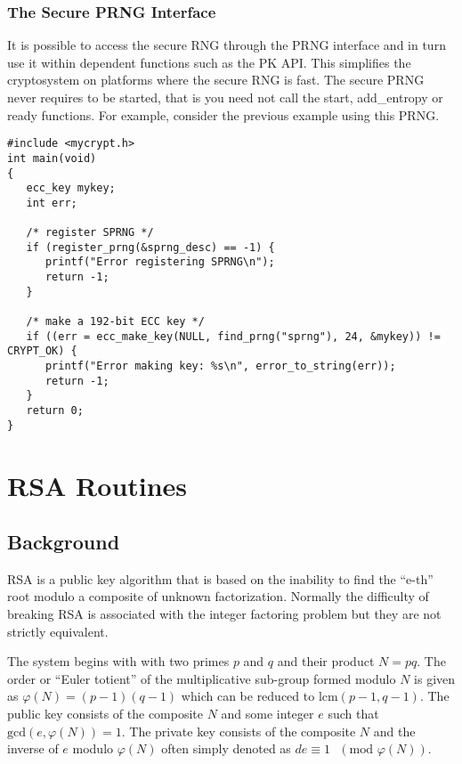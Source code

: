 \documentclass[b5paper]{book}
\def\phi{\varphi}
\begin{document}
\subsection{The Secure PRNG Interface}
It is possible to access the secure RNG through the PRNG interface and in turn use it within dependent functions such
as the PK API.  This simplifies the cryptosystem on platforms where the secure RNG is fast.  The secure PRNG never 
requires to be started, that is you need not call the start, add\_entropy or ready functions.  For example, consider
the previous example using this PRNG.

\begin{small}
\begin{verbatim}
#include <mycrypt.h>
int main(void)
{
   ecc_key mykey;
   int err;

   /* register SPRNG */
   if (register_prng(&sprng_desc) == -1) {
      printf("Error registering SPRNG\n");
      return -1;
   }

   /* make a 192-bit ECC key */
   if ((err = ecc_make_key(NULL, find_prng("sprng"), 24, &mykey)) != CRYPT_OK) {
      printf("Error making key: %s\n", error_to_string(err));
      return -1;
   }
   return 0;
}
\end{verbatim}
\end{small}

\chapter{RSA Routines}

\section{Background}

RSA is a public key algorithm that is based on the inability to find the ``e-th'' root modulo a composite of unknown 
factorization.  Normally the difficulty of breaking RSA is associated with the integer factoring problem but they are
not strictly equivalent.

The system begins with with two primes $p$ and $q$ and their product $N = pq$.  The order or ``Euler totient'' of the
multiplicative sub-group formed modulo $N$ is given as $\phi(N) = (p - 1)(q - 1)$ which can be reduced to 
$\mbox{lcm}(p - 1, q - 1)$.  The public key consists of the composite $N$ and some integer $e$ such that 
$\mbox{gcd}(e, \phi(N)) = 1$.  The private key consists of the composite $N$ and the inverse of $e$ modulo $\phi(N)$ 
often simply denoted as $de \equiv 1\mbox{ }(\mbox{mod }\phi(N))$.
\end{document}
